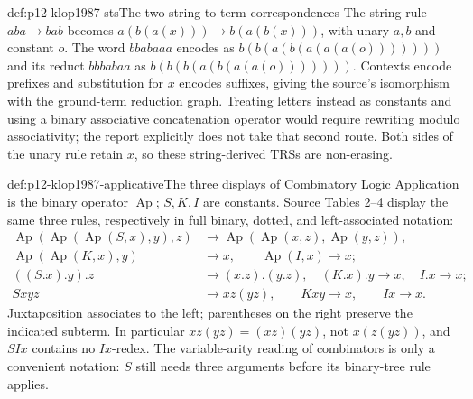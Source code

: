 \begin{hbexample}{def:p12-klop1987-sts}{The two string-to-term correspondences}
The string rule \(aba\to bab\) becomes
\(a(b(a(x)))\to b(a(b(x)))\), with unary \(a,b\) and constant \(o\).
The word \(bbabaaa\) encodes as
\(b(b(a(b(a(a(a(o)))))))\) and its reduct \(bbbabaa\) as
\(b(b(b(a(b(a(a(o)))))))\). Contexts encode prefixes and substitution
for \(x\) encodes suffixes, giving the source's isomorphism with the
ground-term reduction graph. Treating letters instead as constants and
using a binary associative concatenation operator would require rewriting
modulo associativity; the report explicitly does not take that second
route. Both sides of the unary rule retain \(x\), so these string-derived
TRSs are non-erasing.
\end{hbexample}

\begin{hbdefinition}{def:p12-klop1987-applicative}{The three displays of Combinatory Logic}
Application is the binary operator \(\operatorname{Ap}\); \(S,K,I\)
are constants. Source Tables 2--4 display the same three rules, respectively
in full binary, dotted, and left-associated notation:
\begin{align*}
 \operatorname{Ap}(\operatorname{Ap}(\operatorname{Ap}(S,x),y),z)
 &\to\operatorname{Ap}(\operatorname{Ap}(x,z),\operatorname{Ap}(y,z)),\\
 \operatorname{Ap}(\operatorname{Ap}(K,x),y)&\to x,\qquad
 \operatorname{Ap}(I,x)\to x;\\
 ((S.x).y).z&\to(x.z).(y.z),\quad(K.x).y\to x,\quad I.x\to x;\\
 Sxyz&\to xz(yz),\qquad Kxy\to x,\qquad Ix\to x.
\end{align*}
Juxtaposition associates to the left; parentheses on the right preserve
the indicated subterm. In particular \(xz(yz)=(xz)(yz)\), not
\(x(z(yz))\), and \(SIx\) contains no \(Ix\)-redex.
The variable-arity reading of combinators is only a convenient notation:
\(S\) still needs three arguments before its binary-tree rule applies.
\end{hbdefinition}

